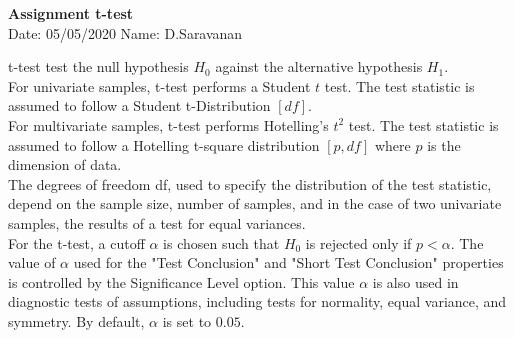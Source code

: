 \documentclass[a4paper,11pt,openright]{report}
\begin{document}
\singlespacing
\pagestyle{plain}

\begin{center}
\textbf{Assignment t-test} \\
Date: 05/05/2020 \hspace{2mm} Name: D.Saravanan
\end{center}

\vspace{10px}

t-test test the null hypothesis $H_{0}$ against the alternative hypothesis $H_{1}$. \\

For univariate samples, t-test performs a Student $t$ test. The test statistic is assumed to
follow a Student t-Distribution $[df]$. \\ 

For multivariate samples, t-test performs Hotelling's $t^{2}$ test. The test statistic is
assumed to follow a Hotelling t-square distribution $[p,df]$ where $p$ is the dimension of
data. \\

The degrees of freedom df, used to specify the distribution of the test statistic, depend on
the sample size, number of samples, and in the case of two univariate samples, the results 
of a test for equal variances. \\ 

For the t-test, a cutoff $\alpha$ is chosen such that $H_{0}$ is rejected only if $p < 
\alpha$. The value of $\alpha$ used for the "Test Conclusion" and "Short Test Conclusion"
properties is controlled by the Significance Level option. This value $\alpha$ is also used
in diagnostic tests of assumptions, including tests for normality, equal variance, and
symmetry. By default, $\alpha$ is set to $0.05$. \\

\vspace{1cm}
\end{document}
